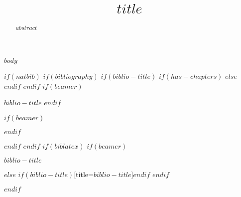 \documentclass[11pt]{article}
\title{$title$}
\author{
$for(by-author)$
  $by-author.name.literal$$if(it.acknowledgements)$\thanks{$it.acknowledgements$}$endif$$if(it.orcid)$\footnote[1]\\$endif$$if(it.url)$\footnote[2]\\$endif$\\
  $if(by-author.affiliations)$
    $for(by-author.affiliations)$
      $it.name$ \\ %
      $if(it.address)$
        $it.address$ \\ %
      $endif$
    $endfor$
  $endif$
  $if(by-author.email)$
    \texttt{$by-author.email$} \\ %
  $endif$
  $if(by-author.note)$
    \AND %
  $elseif(by-author.attributes.corresponding)$
  $else$
    \And %
  $endif$
$endfor$
}
\begin{document}

\maketitle

\begin{abstract}
$abstract$
\end{abstract}



\startmain %

$body$

$if(natbib)$
$if(bibliography)$
$if(biblio-title)$
$if(has-chapters)$
\renewcommand\bibname{$biblio-title$}
$else$
\renewcommand\refname{$biblio-title$}
$endif$
$endif$
$if(beamer)$
\begin{frame}[allowframebreaks]{$biblio-title$}
  \bibliographytrue
$endif$
  
$if(beamer)$
\end{frame}
$endif$

$endif$
$endif$
$if(biblatex)$
$if(beamer)$
\begin{frame}[allowframebreaks]{$biblio-title$}
  \bibliographytrue
  \printbibliography[heading=none]
\end{frame}
$else$
\printbibliography$if(biblio-title)$[title=$biblio-title$]$endif$
$endif$

$endif$
\end{document}

